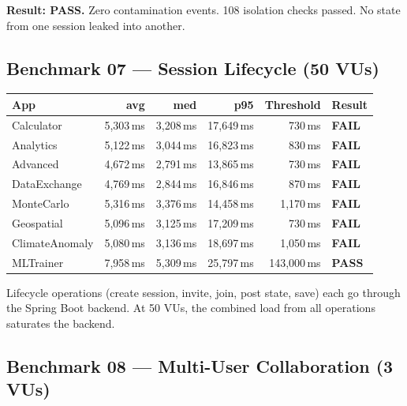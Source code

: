 \documentclass[11pt,a4paper]{article}
\begin{document}
\textbf{Result: PASS.} Zero contamination events. 108 isolation checks
passed. No state from one session leaked into another.

\subsection{Benchmark 07 — Session Lifecycle (50 VUs)}

\begin{center}
\begin{tabular}{lrrrrl}
\toprule
\textbf{App} & \textbf{avg} & \textbf{med} & \textbf{p95} & \textbf{Threshold} & \textbf{Result} \\
\midrule
Calculator     & 5,303\,ms & 3,208\,ms & 17,649\,ms &    730\,ms & \textbf{FAIL} \\
Analytics      & 5,122\,ms & 3,044\,ms & 16,823\,ms &    830\,ms & \textbf{FAIL} \\
Advanced       & 4,672\,ms & 2,791\,ms & 13,865\,ms &    730\,ms & \textbf{FAIL} \\
DataExchange   & 4,769\,ms & 2,844\,ms & 16,846\,ms &    870\,ms & \textbf{FAIL} \\
MonteCarlo     & 5,316\,ms & 3,376\,ms & 14,458\,ms &  1,170\,ms & \textbf{FAIL} \\
Geospatial     & 5,096\,ms & 3,125\,ms & 17,209\,ms &    730\,ms & \textbf{FAIL} \\
ClimateAnomaly & 5,080\,ms & 3,136\,ms & 18,697\,ms &  1,050\,ms & \textbf{FAIL} \\
MLTrainer      & 7,958\,ms & 5,309\,ms & 25,797\,ms & 143,000\,ms & \textbf{PASS} \\
\bottomrule
\end{tabular}
\end{center}

\noindent Lifecycle operations (create session, invite, join, post
state, save) each go through the Spring Boot backend. At 50 VUs,
the combined load from all operations saturates the backend.

\subsection{Benchmark 08 — Multi-User Collaboration (3 VUs)}
\end{document}
